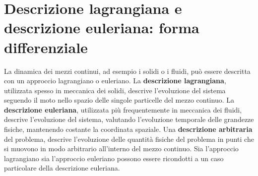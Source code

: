 
\section{Descrizione lagrangiana e descrizione euleriana: forma differenziale}\label{ch:lagrEul}
 
La dinamica dei mezzi continui, ad esempio i solidi o i fluidi, può essere descritta con un approccio lagrangiano o euleriano. La \textbf{descrizione lagrangiana}, utilizzata spesso in meccanica dei solidi, descrive l'evoluzione del sistema seguendo il moto nello spazio delle singole particelle del mezzo continuo. La \textbf{descrizione euleriana}, utilizzata più frequentemente in meccanica dei fluidi, descrive l'evoluzione del sistema, valutando l'evoluzione temporale delle grandezze fisiche, mantenendo costante la coordinata spaziale. Una \textbf{descrizione arbitraria} del problema, descrive l'evoluzione delle quantità fisiche del problema in punti che si muovono in modo arbitrario all'interno del mezzo continuo. Sia l'approccio lagrangiano sia l'approccio euleriano possono essere ricondotti a un caso particolare della descrizione euleriana.


